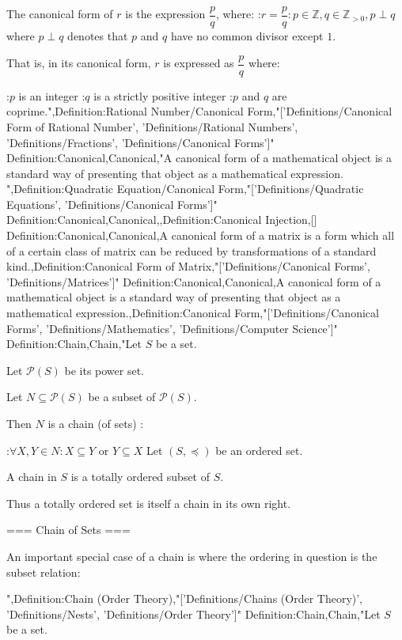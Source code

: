 The canonical form of $r$ is the expression $\dfrac p q$, where:
:$r = \dfrac p q: p \in \mathbb Z, q \in \mathbb Z_{>0}, p \perp q$
where $p \perp q$ denotes that $p$ and $q$ have no common divisor except $1$.


That is, in its canonical form, $r$ is expressed as $\dfrac p q$ where:

:$p$ is an integer
:$q$ is a strictly positive integer
:$p$ and $q$ are coprime.",Definition:Rational Number/Canonical Form,"['Definitions/Canonical Form of Rational Number', 'Definitions/Rational Numbers', 'Definitions/Fractions', 'Definitions/Canonical Forms']"
Definition:Canonical,Canonical,"A canonical form of a mathematical object is a standard way of presenting that object as a mathematical expression.
",Definition:Quadratic Equation/Canonical Form,"['Definitions/Quadratic Equations', 'Definitions/Canonical Forms']"
Definition:Canonical,Canonical,,Definition:Canonical Injection,[]
Definition:Canonical,Canonical,A canonical form of a matrix is a form which all of a certain class of matrix can be reduced by transformations of a standard kind.,Definition:Canonical Form of Matrix,"['Definitions/Canonical Forms', 'Definitions/Matrices']"
Definition:Canonical,Canonical,A canonical form of a mathematical object is a standard way of presenting that object as a mathematical expression.,Definition:Canonical Form,"['Definitions/Canonical Forms', 'Definitions/Mathematics', 'Definitions/Computer Science']"
Definition:Chain,Chain,"Let $S$ be a set.

Let $\mathcal P \left( S \right)$ be its power set.

Let $N \subseteq \mathcal P \left( S \right)$ be a subset of $\mathcal P \left( S \right)$.


Then $N$ is a chain (of sets) :

:$\forall X, Y \in N: X \subseteq Y$ or $Y \subseteq X$
Let $\left( S, \preceq \right)$ be an ordered set.


A chain in $S$ is a totally ordered subset of $S$.


Thus a totally ordered set is itself a chain in its own right.


=== Chain of Sets ===

An important special case of a chain is where the ordering in question is the subset relation:


",Definition:Chain (Order Theory),"['Definitions/Chains (Order Theory)', 'Definitions/Nests', 'Definitions/Order Theory']"
Definition:Chain,Chain,"Let $S$ be a set.

